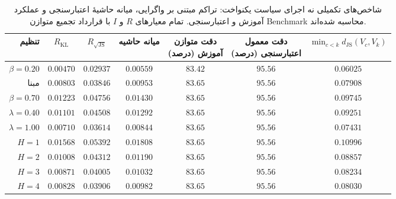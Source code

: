 \begin{table}[htbp]
\centering\scriptsize
\caption{شاخص‌های تکمیلی نه اجرای سیاست یکنواخت: تراکم مبتنی بر واگرایی، میانه حاشیهٔ اعتبارسنجی و عملکرد آموزش و اعتبارسنجی. تمام معیارهای $R$ و $I$ با قرارداد تجمیع متوازن Benchmark محاسبه شده‌اند.}
\label{tab:ch4-uniform-sensitivity-diagnostics}
\begin{tabular}{rcccccc}\hline
تنظیم & $R_{\mathrm{KL}}$ & $R_{\sqrt{\mathrm{JS}}}$ & میانه حاشیه & \shortstack{دقت متوازن\\آموزش (درصد)} & \shortstack{دقت معمول\\اعتبارسنجی (درصد)} & $\min_{c<k}d_{\mathrm{JS}}(V_c,V_k)$\\\hline
$\beta=0.20$ & $0.00470$ & $0.02937$ & $0.00559$ & $83.42$ & $95.56$ & $0.06025$\\
مبنا & $0.00803$ & $0.03846$ & $0.00953$ & $83.65$ & $95.56$ & $0.07908$\\
$\beta=0.70$ & $0.01223$ & $0.04756$ & $0.01430$ & $83.65$ & $95.56$ & $0.09745$\\
$\lambda=0.40$ & $0.01101$ & $0.04508$ & $0.01292$ & $83.65$ & $95.56$ & $0.09251$\\
$\lambda=1.00$ & $0.00710$ & $0.03614$ & $0.00844$ & $83.65$ & $95.56$ & $0.07431$\\
$H=1$ & $0.01568$ & $0.05392$ & $0.01808$ & $83.65$ & $95.56$ & $0.10996$\\
$H=2$ & $0.01008$ & $0.04312$ & $0.01190$ & $83.65$ & $95.56$ & $0.08857$\\
$H=3$ & $0.00871$ & $0.04005$ & $0.01032$ & $83.65$ & $95.56$ & $0.08234$\\
$H=4$ & $0.00828$ & $0.03906$ & $0.00982$ & $83.65$ & $95.56$ & $0.08030$\\
\hline
\end{tabular}
\end{table}

